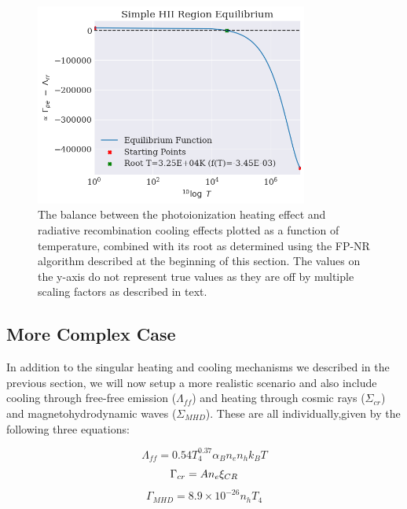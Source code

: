 \begin{figure}
    \centering
    \includegraphics[width=0.8\textwidth]{results/simple_hiiregion_roots.png}
    \caption{The balance between the photoionization heating effect and radiative recombination cooling effects plotted as a function of temperature, combined with its root as determined using the FP-NR algorithm described at the beginning of this section. The values on the y-axis do not represent true values as they are off by multiple scaling factors as described in text.}
    \label{fig:simple_roots}
\end{figure}



\subsection{More Complex Case}

In addition to the singular heating and cooling mechanisms we described in the previous section, we will now setup a more realistic scenario and also include cooling through free-free emission ($\Lambda_{ff}$) and heating through cosmic rays ($\Sigma_{cr}$) and magnetohydrodynamic waves ($\Sigma_{MHD}$). These are all individually,given by the following three equations:

\begin{equation}
    \Lambda_{ff} = 0.54 T_4^{0.37}\alpha_Bn_en_hk_BT
\end{equation}
\begin{equation}
    \Gamma_{cr} = An_e\xi_{CR} \\
\end{equation}
\begin{equation}
    \Gamma_{MHD} = 8.9 \times 10^{-26}n_hT_4
\end{equation}

